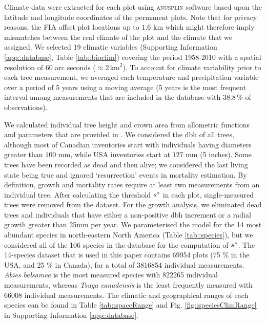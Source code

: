 Climate data were extracted for each plot using \textsc{anusplin} software \citep{McKenney2011} based upon the latitude and longitude coordinates of the permanent plots. Note that for privacy reasons, the FIA offset plot locations up to $ 1.6 $ km \citep{Gray2012} which might therefore imply mismatches between the real climate of the plot and the climate that we assigned. We selected 19 climatic variables (Supporting Information \ref{app::database}, Table \ref{tab::bioclim}) covering the period 1958-2010 with a spatial resolution of 60 arc seconds ($ \approx 2 \, \text{km}^2 $). To account for climate variability prior to each tree measurement, we averaged each temperature and precipitation variable over a period of 5 years using a moving average (5 years is the most frequent interval among measurements that are included in the database with $ 38.8 \, \% $ of observations).

We calculated individual tree height and crown area from allometric functions and parameters that are provided in \citet{Purves2007}. We considered the dbh of all trees, although most of Canadian inventories start with individuals having diameters greater than $ 100 $ mm, while USA inventories start at $ 127 $ mm (5 inches). Some trees have been recorded as dead and then alive; we considered the last living state being true and ignored `resurrection' events in mortality estimation. By definition, growth and mortality rates require at least two measurements from an individual tree. After calculating the threshold $ {s}^{*} $ in each plot, single-measured trees were removed from the dataset. For the growth analysis, we eliminated dead trees and individuals that have either a non-positive dbh increment or a radial growth greater than 25mm per year. We parameterised the model for the 14 most abundant species in north-eastern North America (Table \ref{tab::species}), but we considered all of the 106 species in the database for the computation of $ {s}^{*} $. The 14-species dataset that is used in this paper contains \num{69954} plots (75 \% in the USA, and 25 \% in Canada), for a total of \num{3816854} individual measurements. \textit{Abies balsamea} is the most measured species with \num{822265} individual measurements, whereas \textit{Tsuga canadensis} is the least frequently measured with \num{66008} individual measurements. The climatic and geographical ranges of each species can be found in Table \ref{tab::spaceRange} and Fig. \ref{fig::speciesClimRange} in Supporting Information \ref{app::database}.

